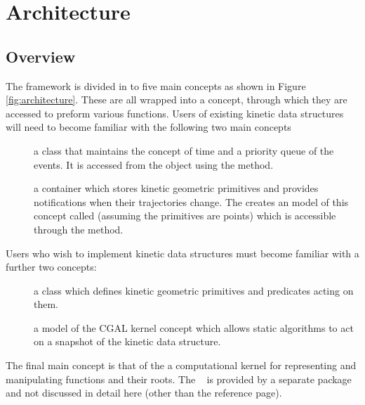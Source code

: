 
\section{Architecture}
\label{sec:architecture}


\subsection{Overview}
\label{sec:architecture_overview}

The framework is divided in to five main concepts as shown in Figure
\ref{fig:architecture}. These are all wrapped into a
 concept, through which they are accessed to
preform various functions. Users of existing kinetic data structures will need to become familiar with the following two main concepts 
\begin{description}
\item[] a class that maintains the concept of time and a priority
  queue of the events. It is accessed from the  object using the  method.
\item[] a container which stores kinetic geometric
  primitives and provides notifications when their trajectories
  change. The  creates an model of this concept
  called  (assuming the
  primitives are points) which is accessible through the
   method.
\end{description}
Users who wish to implement kinetic data structures must become
familiar with a further two concepts:
\begin{description}
\item[]  a class which defines kinetic geometric primitives and
  predicates acting on them.
\item[] a model of the CGAL kernel concept which allows static
  algorithms to act on a snapshot of the kinetic data structure.
\end{description}
The final main concept is that of the  a
computational kernel for representing and manipulating functions and
their roots. The ~ is provided by a separate
package and not discussed in detail here (other than the reference
page).

